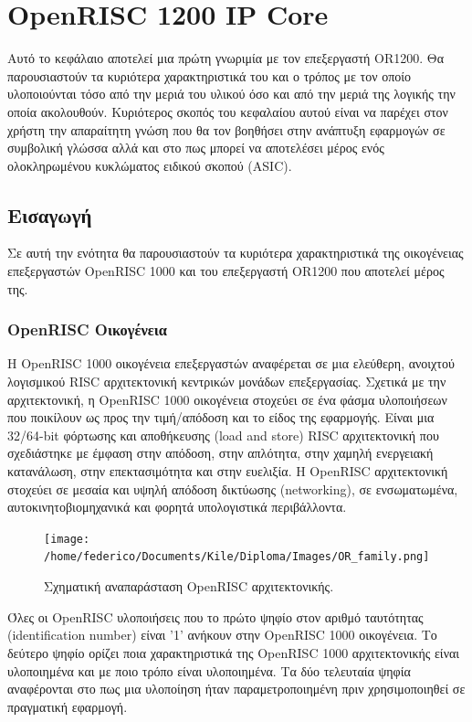 \documentclass[a4paper,10pt]{article}
\numberwithin{figure}{section}
\numberwithin{table}{section}
\begin{document}
\newpage
\newpage
\section{OpenRISC 1200 IP Core}
Αυτό το κεφάλαιο αποτελεί μια πρώτη γνωριμία με τον επεξεργαστή OR1200. Θα παρουσιαστούν τα κυριότερα χαρακτηριστικά του και ο τρόπος με τον οποίο υλοποιούνται τόσο από την μεριά του υλικού όσο και από την μεριά της λογικής την οποία ακολουθούν. Κυριότερος σκοπός του κεφαλαίου αυτού είναι να παρέχει στον χρήστη την απαραίτητη γνώση που θα τον βοηθήσει στην ανάπτυξη εφαρμογών σε συμβολική γλώσσα αλλά και στο πως μπορεί να αποτελέσει μέρος ενός ολοκληρωμένου κυκλώματος ειδικού σκοπού (ASIC).

\subsection{Εισαγωγή}

Σε αυτή την ενότητα θα παρουσιαστούν τα κυριότερα χαρακτηριστικά της οικογένειας επεξεργαστών OpenRISC 1000 και του επεξεργαστή OR1200 που αποτελεί μέρος της.

\subsubsection{OpenRISC Οικογένεια}
Η OpenRISC 1000 οικογένεια επεξεργαστών αναφέρεται σε μια ελεύθερη, ανοιχτού
λογισμικού RISC αρχιτεκτονική κεντρικών μονάδων επεξεργασίας. Σχετικά με την
αρχιτεκτονική, η OpenRISC 1000 οικογένεια στοχεύει σε ένα φάσμα υλοποιήσεων που	
ποικίλουν ως προς την τιμή/απόδοση και το είδος της εφαρμογής. Είναι μια 
32/64-bit φόρτωσης και αποθήκευσης (load and store) RISC αρχιτεκτονική που σχεδιάστηκε
με έμφαση στην απόδοση, στην απλότητα, στην χαμηλή ενεργειακή κατανάλωση, στην επεκτασιμότητα
και στην ευελιξία. Η OpenRISC αρχιτεκτονική στοχεύει σε μεσαία και υψηλή απόδοση
δικτύωσης (networking), σε ενσωματωμένα, αυτοκινητοβιομηχανικά και φορητά υπολογιστικά περιβάλλοντα. 

\vspace{0.7cm}
\begin{figure}[h!]
 \centering
 \texttt{[image: /home/federico/Documents/Kile/Diploma/Images/OR\_family.png]}
 \caption{Σχηματική αναπαράσταση OpenRISC αρχιτεκτονικής.}
\end{figure}
\vspace{0.7cm}


Όλες οι OpenRISC υλοποιήσεις που το πρώτο ψηφίο στον αριθμό ταυτότητας
(identification number) είναι '1' ανήκουν στην 
OpenRISC 1000 οικογένεια. Το δεύτερο ψηφίο ορίζει ποια χαρακτηριστικά της OpenRISC
1000 αρχιτεκτονικής είναι υλοποιημένα και με ποιο τρόπο είναι υλοποιημένα. Τα δύο
τελευταία ψηφία αναφέρονται στο πως μια υλοποίηση ήταν παραμετροποιημένη πριν 
χρησιμοποιηθεί σε πραγματική εφαρμογή. 
\end{document}
